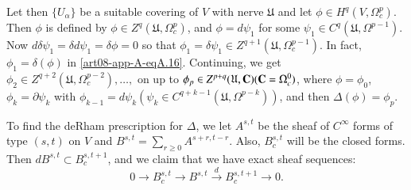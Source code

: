 Let then $\{U_{\alpha}\}$ be a suitable covering of $V$ with nerve $\mathfrak{U}$ and let $\phi\in H^{q}(V,\Omega^{p}_{c})$. Then $\phi$ is defined by $\phi\in Z^{q}(\mathfrak{U},\Omega^{p}_{c})$, and $\phi=d\psi_{1}$ for some $\psi_{1}\in C^{q}(\mathfrak{U},\Omega^{p-1})$. Now $d\delta \psi_{1}=\delta d\psi_{1}=\delta \phi=0$ so that $\phi_{1}=\delta \psi_{1}\in Z^{q+1}(\mathfrak{U}, \Omega^{p-1}_{c})$. In fact, $\phi_{1}=\delta(\phi)$ in \eqref{art08-app-A-eqA.16}. Continuing, we get $\phi_{2}\in Z^{q+2}(\mathfrak{U},\Omega^{p-2}_{c}),\ldots,$ on up to $\phi_{p}\in Z^{p+q}(\mathfrak{U},\mathbf{C})(\mathbf{C}=\Omega^{0}_{c})$, where $\phi=\phi_{0}$, $\phi_{k}=\partial \psi_{k}$ with $\phi_{k-1}=d\psi_{k}(\psi_{k}\in C^{q+k-1}(\mathfrak{U},\Omega^{p-k}))$, and then $\Delta(\phi)=\phi_{p}$.

To find the deRham prescription for $\Delta$, we let $A^{s,t}$ be the sheaf of $C^{\infty}$ forms of type $(s,t)$ on $V$ and $B^{s,t}=\sum\limits_{r\geq 0}A^{s+r,t-r}$. Also, $B^{s,t}_{c}$ will be the closed forms. Then $dB^{s,t}\subset B^{s,t+1}_{c}$, and we claim that we have exact sheaf sequences:
\begin{equation*}
0\to B^{s,t}_{c}\to B^{s,t}\xrightarrow{d} B^{s,t+1}_{c}\to 0.\tag{A1.19}\label{art08-app-A-eqA.19}
\end{equation*}

